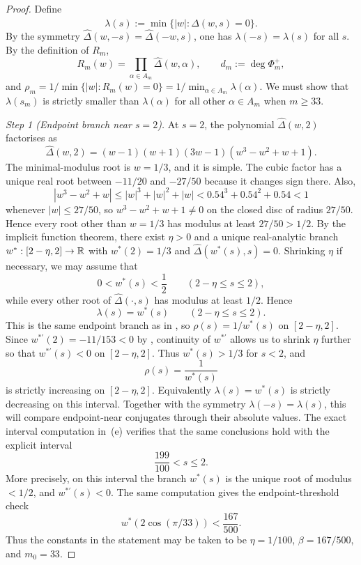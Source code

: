 \begin{proof}

Define
\[
  \lambda(s):=\min\bigl\{|w|:\widehat\Delta(w,s)=0\bigr\}.
\]
By the symmetry \(\widehat\Delta(w,-s)=\widehat\Delta(-w,s)\), one has
\(\lambda(-s)=\lambda(s)\) for all \(s\). By the definition of \(R_m\),
\[
  R_m(w)=
    \prod_{\alpha\in A_m}\widehat\Delta(w,\alpha),
  \qquad d_m:=\deg\Phi_m^+,
\]
and \(\rho_m=1/\min\{|w|:R_m(w)=0\}=1/\min_{\alpha\in A_m}\lambda(\alpha)\).
We must show that \(\lambda(s_m)\) is strictly smaller than
\(\lambda(\alpha)\) for all other \(\alpha\in A_m\) when \(m\ge33\).

\medskip
\noindent\textit{Step 1 (Endpoint branch near \(s=2\)).}\quad
At \(s=2\), the polynomial \(\widehat\Delta(w,2)\) factorises as
\[
  \widehat\Delta(w,2)=(w-1)(w+1)(3w-1)(w^3-w^2+w+1).
\]
The minimal-modulus root is \(w=1/3\), and it is simple. The cubic
factor has a unique real root between \(-11/20\) and \(-27/50\) because
it changes sign there. Also,
\[
  |w^3-w^2+w|\le |w|^3+|w|^2+|w|<0.54^3+0.54^2+0.54<1
\]
whenever \(|w|\le 27/50\), so \(w^3-w^2+w+1\neq 0\) on the closed disc
of radius \(27/50\). Hence every root other than \(w=1/3\) has modulus
at least \(27/50>1/2\).
By the implicit function theorem, there exist \(\eta>0\) and a unique real-analytic branch
\(w^*:[2-\eta,2]\to\mathbb{R}\) with \(w^*(2)=1/3\) and
\(\widehat\Delta(w^*(s),s)=0\). Shrinking \(\eta\) if necessary, we may
assume that
\[
  0<w^*(s)<\frac12
  \qquad (2-\eta\le s\le 2),
\]
while every other root of \(\widehat\Delta(\cdot,s)\) has modulus at
least \(1/2\). Hence
\[
  \lambda(s)=w^*(s)
  \qquad (2-\eta\le s\le 2).
\]
This is the same endpoint branch as in ,
so \(\rho(s)=1/w^*(s)\) on \([2-\eta,2]\).
Since \(w^{*\prime}(2)=-11/153<0\) by ,
continuity of \(w^{*\prime}\) allows us to shrink \(\eta\) further so
that \(w^{*\prime}(s)<0\) on \([2-\eta,2]\). Thus \(w^*(s)>1/3\) for
\(s<2\), and
\[
  \rho(s)=\frac{1}{w^*(s)}
\]
is strictly increasing on \([2-\eta,2]\).
Equivalently \(\lambda(s)=w^*(s)\) is strictly decreasing on this
interval. Together with the symmetry \(\lambda(-s)=\lambda(s)\), this
will compare endpoint-near conjugates through their absolute values.
The exact interval computation in
\,\textup{(e)} verifies that the same
conclusions hold with the explicit interval
\[
  \frac{199}{100}< s\le2.
\]
More precisely, on this interval the branch \(w^*(s)\) is the unique
root of modulus \(<1/2\), and \(w^{*\prime}(s)<0\). The same
computation gives the endpoint-threshold check
\[
  w^*(2\cos(\pi/33))<\frac{167}{500}.
\]
Thus the constants in the statement may be taken to be
\(\eta=1/100\), \(\beta=167/500\), and \(m_0=33\).


\end{proof}
